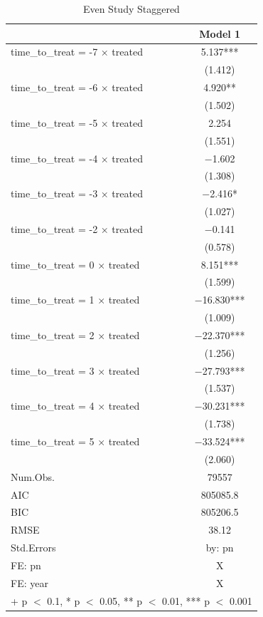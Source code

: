 \documentclass[
]{article}
\begin{document}
\begin{table}

\caption{\label{tab:table-4}Even Study Staggered}
\centering
\begin{tabular}[t]{lc}
\toprule
  & Model 1\\
\midrule
time\_to\_treat = -7 × treated & \num{5.137}***\\
 & (\num{1.412})\\
time\_to\_treat = -6 × treated & \num{4.920}**\\
 & (\num{1.502})\\
time\_to\_treat = -5 × treated & \num{2.254}\\
 & (\num{1.551})\\
time\_to\_treat = -4 × treated & \num{-1.602}\\
 & (\num{1.308})\\
time\_to\_treat = -3 × treated & \num{-2.416}*\\
 & (\num{1.027})\\
time\_to\_treat = -2 × treated & \num{-0.141}\\
 & (\num{0.578})\\
time\_to\_treat = 0 × treated & \num{8.151}***\\
 & (\num{1.599})\\
time\_to\_treat = 1 × treated & \num{-16.830}***\\
 & (\num{1.009})\\
time\_to\_treat = 2 × treated & \num{-22.370}***\\
 & (\num{1.256})\\
time\_to\_treat = 3 × treated & \num{-27.793}***\\
 & (\num{1.537})\\
time\_to\_treat = 4 × treated & \num{-30.231}***\\
 & (\num{1.738})\\
time\_to\_treat = 5 × treated & \num{-33.524}***\\
 & (\num{2.060})\\
\midrule
Num.Obs. & \num{79557}\\
AIC & \num{805085.8}\\
BIC & \num{805206.5}\\
RMSE & \num{38.12}\\
Std.Errors & by: pn\\
FE: pn & X\\
FE: year & X\\
\bottomrule
\multicolumn{2}{l}{\rule{0pt}{1em}+ p $<$ 0.1, * p $<$ 0.05, ** p $<$ 0.01, *** p $<$ 0.001}\\
\end{tabular}
\end{table}
\end{document}
